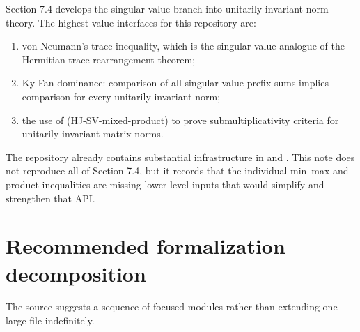 Section 7.4 develops the singular-value branch into unitarily invariant norm theory. The highest-value interfaces for this repository are:
\begin{enumerate}[leftmargin=2em]
\item von Neumann's trace inequality, which is the singular-value analogue of the Hermitian trace rearrangement theorem;
\item Ky Fan dominance: comparison of all singular-value prefix sums implies comparison for every unitarily invariant norm;
\item the use of (HJ-SV-mixed-product) to prove submultiplicativity criteria for unitarily invariant matrix norms.
\end{enumerate}
The repository already contains substantial infrastructure in  and . This note does not reproduce all of Section 7.4, but it records that the individual min--max and product inequalities are missing lower-level inputs that would simplify and strengthen that API.

\section{Recommended formalization decomposition}

The source suggests a sequence of focused modules rather than extending one large file indefinitely.

